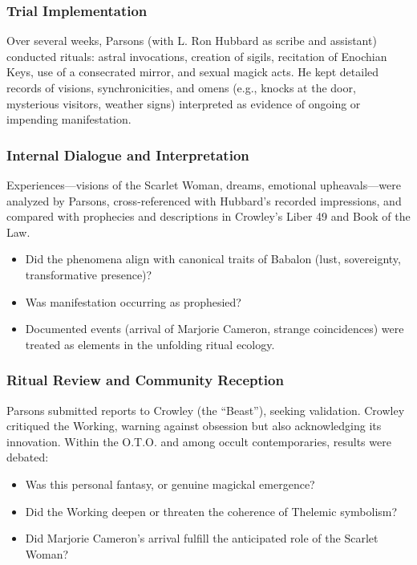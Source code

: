 \subsubsection*{Trial Implementation}

Over several weeks, Parsons (with L. Ron Hubbard as scribe and assistant)
conducted rituals: astral invocations, creation of sigils, recitation of
Enochian Keys, use of a consecrated mirror, and sexual magick acts. He kept
detailed records of visions, synchronicities, and omens (e.g., knocks at the
door, mysterious visitors, weather signs) interpreted as evidence of ongoing or
impending manifestation.

\subsubsection*{Internal Dialogue and Interpretation}

Experiences—visions of the Scarlet Woman, dreams, emotional upheavals—were
analyzed by Parsons, cross-referenced with Hubbard’s recorded impressions, and
compared with prophecies and descriptions in Crowley’s Liber 49 and Book of the
Law.

\begin{itemize}

  \item Did the phenomena align with canonical traits of Babalon (lust,
    sovereignty, transformative presence)?

  \item Was manifestation occurring as prophesied?

  \item Documented events (arrival of Marjorie Cameron, strange coincidences)
    were treated as elements in the unfolding ritual ecology.

\end{itemize}

\subsubsection{Ritual Review and Community Reception}

Parsons submitted reports to Crowley (the “Beast”), seeking validation. Crowley
critiqued the Working, warning against obsession but also acknowledging its
innovation. Within the O.T.O. and among occult contemporaries, results were
debated:

\begin{itemize}

  \item Was this personal fantasy, or genuine magickal emergence?

  \item Did the Working deepen or threaten the coherence of Thelemic symbolism?

  \item Did Marjorie Cameron's arrival fulfill the anticipated role of the
    Scarlet Woman?

\end{itemize}

